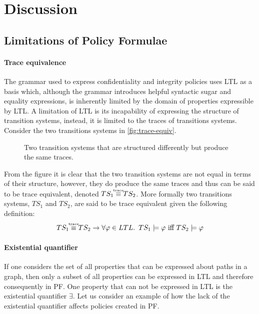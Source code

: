 \section{Discussion}\label{sec:discussion}
\subsection{Limitations of Policy Formulae}\label{sec:limitations}
\paragraph{Trace equivalence}
The grammar used to express confidentiality and integrity policies uses LTL as a basis which, although the grammar introduces helpful syntactic sugar and equality expressions, is inherently limited by the domain of properties expressible by LTL. A limitation of LTL is its incapability of expressing the structure of transition systems, instead, it is limited to the traces of transitions systems. Consider the two transitions systems in \autoref{fig:trace-equiv}.
\begin{figure}[!ht]
    \centering
    
    \caption{Two transition systems that are structured differently but produce the same traces.}
    \label{fig:trace-equiv}
\end{figure}
From the figure it is clear that the two transition systems are not equal in terms of their structure, however, they do produce the same traces and thus can be said to be trace equivalent, denoted $TS_1 \equivt TS_2$. More formally two transitions systems, $TS_1$ and $TS_2$, are said to be trace equivalent given the following definition:
\begin{align*}
    TS_1 \equivt TS_2 \rightarrow \forall \phi \in LTL .\enskip TS_1 \models \phi \text{ iff } TS_2 \models \phi
\end{align*}

\paragraph{Existential quantifier} If one considers the set of all properties that can be expressed about paths in a graph, then only a subset of all properties can be expressed in LTL and therefore consequently in PF. One property that can not be expressed in LTL is the existential quantifier $\exists$. Let us consider an example of how the lack of the existential quantifier affects policies created in PF.

